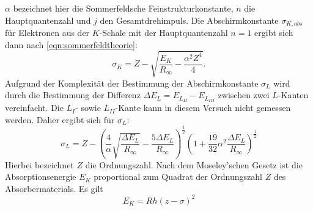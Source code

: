 $\alpha$ bezeichnet hier die Sommerfeldsche Feinstrukturkonstante, $n$ die
Hauptquantenzahl und $j$ den Gesamtdrehimpuls.
Die Abschirmkonstante $\sigma_{K, abs}$ für Elektronen aus der $K$-Schale mit
der Hauptquantenzahl $n = 1$ ergibt sich dann nach \eqref{eqn:sommerfeldtheorie}:
\begin{equation}
  \sigma_K = Z - \sqrt{\frac{E_K}{R_\infty} - \frac{\alpha^2 Z^4}{4}}.
  \label{abschirmktheorie}
\end{equation}
Aufgrund der Komplexität der Bestimmung der Abschirmkonstante $\sigma_L$ wird durch
die Bestimmung der Differenz $\Delta E_L = E_{L_{II}} - E_{L_{III}}$ zwischen
zwei $L$-Kanten vereinfacht. Die $L_{I}$- sowie $L_{II}$-Kante kann in diesem
Versuch nicht gemessen werden. Daher ergibt sich für $\sigma_L$:
\begin{equation}
  \sigma_L = Z - \left( \frac{4}{\alpha} \sqrt{\frac{\Delta E_L}{R_{\infty}}} - \frac{5 \Delta E_L}{R_{\infty}} \right)^{\frac{1}{2}} \left( 1 + \frac{19}{32} \alpha^2 \frac{\Delta E_L}{R_{\infty}} \right)^{\frac{1}{2}}
  \label{eqn:sigmaktheorie}
\end{equation}
Hierbei bezeichnet $Z$ die Ordnungszahl.
Nach dem Moseley'schen Gesetz ist die Absorptionsenergie $E_K$ proportional zum Quadrat der Ordnungszahl $Z$ des Absorbermaterials.
    Es gilt
    \begin{equation}
        E_K = R h (z - \sigma)^2
        \label{eqn:Moseley}
    \end{equation}


